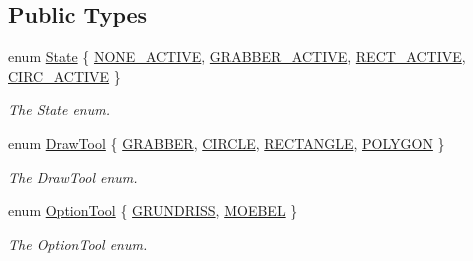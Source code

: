 \subsection*{Public Types}
\begin{DoxyCompactItemize}
\item 
enum \hyperlink{class_tools_a2847c269682818722541d9002fdf0824}{State} \{ \hyperlink{class_tools_a2847c269682818722541d9002fdf0824a39a562c65ff6fde1589fd79d63b16b31}{N\+O\+N\+E\+\_\+\+A\+C\+T\+I\+VE}, 
\hyperlink{class_tools_a2847c269682818722541d9002fdf0824ad6c9098c08b610749e430f97f83f95bd}{G\+R\+A\+B\+B\+E\+R\+\_\+\+A\+C\+T\+I\+VE}, 
\hyperlink{class_tools_a2847c269682818722541d9002fdf0824a19672b3e28d4946b8edd3b42bd20508a}{R\+E\+C\+T\+\_\+\+A\+C\+T\+I\+VE}, 
\hyperlink{class_tools_a2847c269682818722541d9002fdf0824af205a7ab0929002ae4bec7fae92a31e1}{C\+I\+R\+C\+\_\+\+A\+C\+T\+I\+VE}
 \}\begin{DoxyCompactList}\small\item\em The State enum. \end{DoxyCompactList}
\item 
enum \hyperlink{class_tools_ab031688a77e89a80ce8b5db7014684a3}{Draw\+Tool} \{ \hyperlink{class_tools_ab031688a77e89a80ce8b5db7014684a3a563beaca84fc18e79f568499ee8fdee7}{G\+R\+A\+B\+B\+ER}, 
\hyperlink{class_tools_ab031688a77e89a80ce8b5db7014684a3a7608a149cc544834de7d2274fa175237}{C\+I\+R\+C\+LE}, 
\hyperlink{class_tools_ab031688a77e89a80ce8b5db7014684a3abc11dd73d5c7e1996dbcf0aab00d095b}{R\+E\+C\+T\+A\+N\+G\+LE}, 
\hyperlink{class_tools_ab031688a77e89a80ce8b5db7014684a3a883ff4bc5dc9f42f40f091328bcf1907}{P\+O\+L\+Y\+G\+ON}
 \}\begin{DoxyCompactList}\small\item\em The Draw\+Tool enum. \end{DoxyCompactList}
\item 
enum \hyperlink{class_tools_a4b55b2ca4eef4d80ae1042233832bb8b}{Option\+Tool} \{ \hyperlink{class_tools_a4b55b2ca4eef4d80ae1042233832bb8ba670c67a855fba32a19f09a8e794d1b8e}{G\+R\+U\+N\+D\+R\+I\+SS}, 
\hyperlink{class_tools_a4b55b2ca4eef4d80ae1042233832bb8ba53d0273a369699f49786930287a5e675}{M\+O\+E\+B\+EL}
 \}\begin{DoxyCompactList}\small\item\em The Option\+Tool enum. \end{DoxyCompactList}
\end{DoxyCompactItemize}
